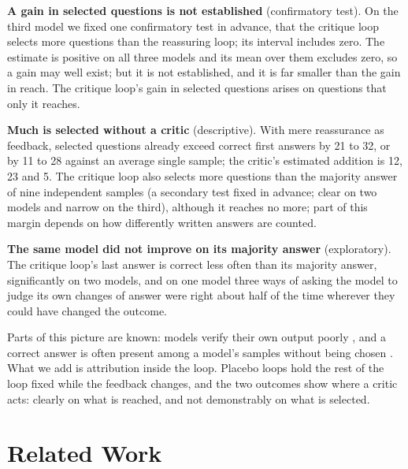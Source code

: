 \documentclass[11pt]{article}
\begin{document}
\textbf{A gain in selected questions is not established} (confirmatory test).
On the third model we fixed one confirmatory test in advance, that the critique loop selects more questions than the reassuring loop; its interval includes zero.
The estimate is positive on all three models and its mean over them excludes zero, so a gain may well exist; but it is not established, and it is far smaller than the gain in reach.
The critique loop's gain in selected questions arises on questions that only it reaches.

\textbf{Much is selected without a critic} (descriptive).
With mere reassurance as feedback, selected questions already exceed correct first answers by 21 to 32, or by 11 to 28 against an average single sample; the critic's estimated addition is 12, 23 and 5.
The critique loop also selects more questions than the majority answer of nine independent samples (a secondary test fixed in advance; clear on two models and narrow on the third), although it reaches no more; part of this margin depends on how differently written answers are counted.

\textbf{The same model did not improve on its majority answer} (exploratory).
The critique loop's last answer is correct less often than its majority answer, significantly on two models, and on one model three ways of asking the model to judge its own changes of answer were right about half of the time wherever they could have changed the outcome.

Parts of this picture are known: models verify their own output poorly \citep{huang2024cannot,stechly2024selfverification,song2024mindgap}, and a correct answer is often present among a model's samples without being chosen \citep{brown2024monkeys,jain2026cliff}.
What we add is attribution inside the loop.
Placebo loops hold the rest of the loop fixed while the feedback changes, and the two outcomes show where a critic acts: clearly on what is reached, and not demonstrably on what is selected.

\section{Related Work}
\end{document}
